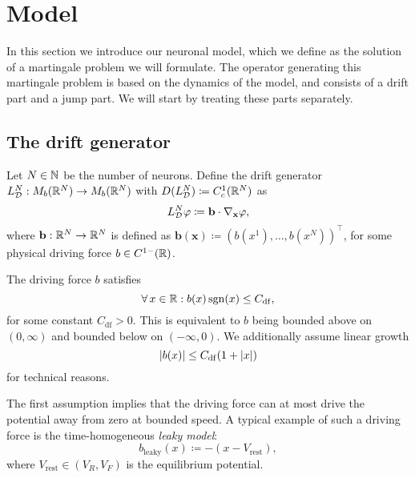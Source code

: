 \section{Model}

In this section we introduce our neuronal model, which we define as the solution of a martingale problem we will formulate.
The operator generating this martingale problem is based on the dynamics of the model, and consists of a drift part and a jump part.
We will start by treating these parts separately.

\subsection{The drift generator}

Let \( N \in \mathbb{N} \) be the number of neurons.
Define the drift generator \(L_{\mathcal{D}}^{N} : M_b(\mathbb{R}^N) \to M_b(\mathbb{R}^N)\) with \(D(L_{\mathcal{D}}^N) \coloneqq C_c^1(\mathbb{R}^N)\) as
\begin{equation}
  L_{\mathcal{D}}^{N}\varphi \coloneqq \mathbf{b} \cdot \nabla_{\mathbf{x}} \varphi,
\end{equation}
where \(\mathbf{b} : \mathbb{R}^N \to \mathbb{R}^N\) is defined as \( \bm{b}(\bm{x}) \coloneqq (b(x^1), \dots, b(x^N))^\top \), for some physical driving force \(b \in C^{1-}(\mathbb{R})\).
\begin{assumption}\label{assum:b-growth}
The driving force \( b \) satisfies
  \begin{equation}
    \forall x \in \potspace : b(x) \sgn(x) \leq C_\mathrm{df},
  \end{equation}
  for some constant \(C_\mathrm{df} > 0\).
  This is equivalent to \( b \) being bounded above on \( (0,\infty) \) and bounded below on \( (-\infty,0) \).
  We additionally assume linear growth
  \begin{equation}
    \lvert b(x)\rvert \leq C_\mathrm{df} (1 + \lvert x\rvert)
  \end{equation}
  for technical reasons.
\end{assumption}
The first assumption implies that the driving force can at most drive the potential away from zero at bounded speed.
A typical example of such a driving force is the time-homogeneous \textit{leaky model}:
\begin{equation}
  b_{\mathrm{leaky}}(x) \coloneqq -(x - V_\mathrm{rest}),
\end{equation}
where \(V_\mathrm{rest} \in (V_R, V_F)\) is the equilibrium potential.

